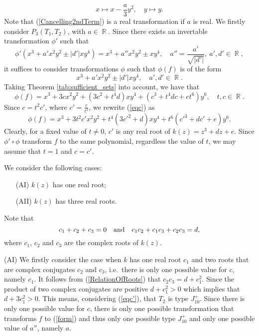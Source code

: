 \documentclass[noend]{amsproc}
\theoremstyle{definition}
\DeclareMathOperator{\R}{\mathbb{R}}
\begin{document}
\begin{equation}\label{Cancelling2ndTerm}
x\mapsto x-\frac{a}{3}y^2,\quad y\mapsto y.
\end{equation}
Note that (\ref{Cancelling2ndTerm}) is a real transformation if $a$ is real.
We firstly consider $P_3(T_1,T_2)$, with $a\in\R$. Since  there exists an invertable transformation $\phi'$ such that
\begin{equation}\label{phi'}
\phi'(x^3+a'x^2y^2\pm |d'|xy^4)=x^3+a''x^2y^2\pm xy^4,\quad a''=\frac{a'}{\sqrt{|d'|}},\  a',d'\in \R,
\end{equation}
it suffices to consider transformations $\phi$ such that $\phi(f)$ is of the form 
\begin{equation}\label{form}
x^3+a'x^2y^2\pm |d'|xy^4,\quad a',d'\in \R.
\end{equation}
Taking Theorem \ref{tab:sufficient_sets} into account, we have that
\begin{equation}\label{eqc}
\phi(f)=x^3+3cx^2y^2+(3c^2+t^4d)xy^4+(c^3+t^4dc+et^6)y^6,\quad t,c\in\R.
\end{equation}
Since $c=t^2c'$, where $c'=\frac{c}{t^2}$, we rewrite (\ref{eqc}) as
\begin{equation}\label{eqc'}
\phi(f)=x^3+3t^2c'x^2y^2+t^4(3c'^2+d)xy^4+t^6(c'^3+dc'+e)y^6.
\end{equation}
Clearly, for a fixed value of $t\neq 0$, $c'$ is any real root of $k(z)=z^3+dz+e$. Since $\phi'\circ\phi$ transform $f$ to the same polynomial, regardless the value of $t$, we may assume that $t=1$ and $c=c'$. 

We consider the following cases:
\begin{itemize}
\item[(AI)]$k(z)$ has one real root;
\item[(AII)]$k(z)$ has three real roots.
\end{itemize}

Note that
\begin{equation}\label{RelationOfRoots}
c_1+c_2+c_3=0\quad\textnormal{and}\quad c_1c_2+c_1c_3+c_2c_3=d,
\end{equation}
where $c_1$, $c_2$ and $c_3$ are the complex roots of $k(z)$.

(AI) We firstly consider the case when $k$ has one real root $c_1$ and two roots that are complex conjugates $c_2$ and $c_3$, i.e.~there is only one possible value for $c$, namely $c_1$. It follows from (\ref{RelationOfRoots}) that $c_2c_3=d+c_1^2$. Since the product of two complex conjugates are positive $d+c_1^2>0$ which implies that $d+3c_1^2>0$. This means, considering (\ref{eqc'}), that $T_2$ is type $J_{10}^+$. Since there is only one possible value for $c$, there is only one possible transformation that transforms $f$ to (\ref{form}) and thus only one possible type $J_{10}^+$ and only one possible value of $a''$, namely $a$.
\end{document}
